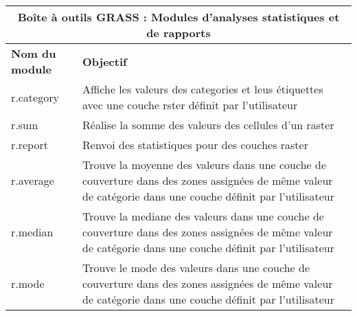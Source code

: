 \vspace{-1cm}

\begin{table}[H]
\centering
 \begin{tabular}{|p{4cm}|p{10cm}|}
   \hline \multicolumn{2}{|c|}{\textbf{Boîte à outils GRASS : Modules d'analyses statistiques et de rapports}} \\
  \hline \textbf{Nom du module} & \textbf{Objectif} \\
  \hline r.category & Affiche les valeurs des categories et leus étiquettes avec une couche rster définit par l'utilisateur \\
  \hline r.sum & Réalise la somme des valeurs des cellules d'un raster \\
  \hline r.report & Renvoi des statistiques pour des couches raster \\
  \hline r.average & Trouve la moyenne des valeurs dans une couche de couverture dans des zones assignées de m\^eme valeur de catégorie dans une couche définit par l'utilisateur \\
  \hline r.median & Trouve la mediane des valeurs dans une couche de couverture dans des zones assignées de m\^eme valeur de catégorie dans une couche définit par l'utilisateur \\
  \hline r.mode & Trouve le mode des valeurs dans une couche de couverture dans des zones assignées de m\^eme valeur de catégorie  dans une couche définit par l'utilisateur \\

\end{tabular}
\end{table}
